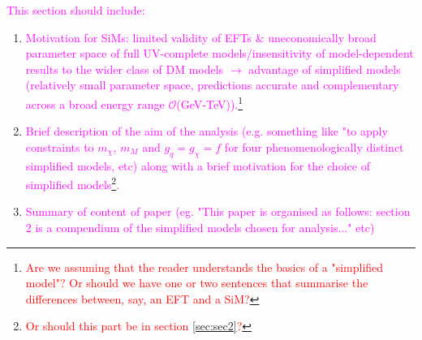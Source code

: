 \begin{flushleft}
\textcolor{magenta}{This section should include:}
\begin{enumerate}
\item \textcolor{magenta}{Motivation for SiMs: limited validity of EFTs \& uneconomically broad parameter space of full UV-complete models/insensitivity of model-dependent results to the wider class of DM models $\rightarrow$ advantage of simplified models (relatively small parameter space, predictions accurate and complementary across a broad energy range $\mathcal{O}$(GeV-TeV)).\footnote{\textcolor{red}{Are we assuming that the reader understands the basics of a "simplified model"? Or should we have one or two sentences that summarise the differences between, say, an EFT and a SiM?}}}
\item \textcolor{magenta}{Brief description of the aim of the analysis (e.g. something like "to apply constraints to $m_{\chi}$, $m_{M}$ and $g_{q} = g_{\chi} = f$ for four phenomenologically distinct simplified models, etc) along with a brief motivation for the choice of simplified models\footnote{\textcolor{red}{Or should this part be in section \ref{sec:sec2}?}}.}
\item \textcolor{magenta}{Summary of content of paper (eg. "This paper is organised as follows: section 2 is a compendium of the simplified models chosen for analysis..." etc)}
\end{enumerate}
\end{flushleft}
